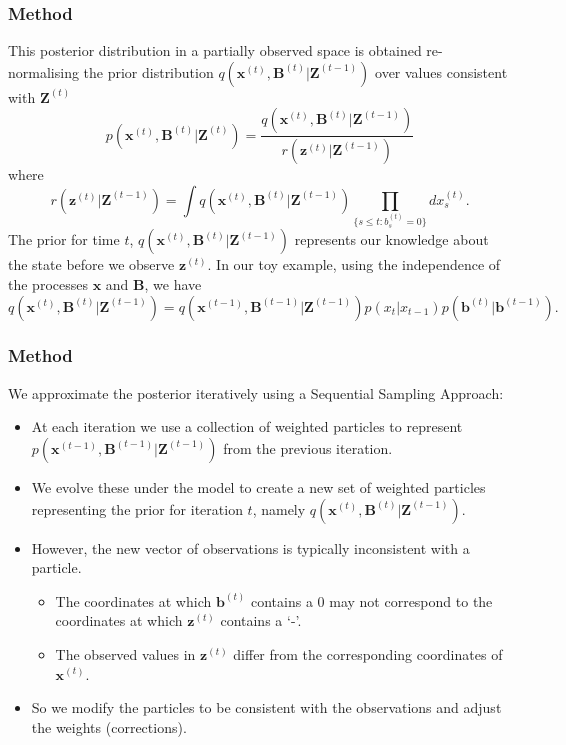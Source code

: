 \documentclass[9pt]{beamer}
\begin{document}
\begin{frame}
\frametitle{Method}
\begin{itemize}
\setlength\itemsep{2em}
This posterior distribution in a partially observed space is obtained re-normalising the prior distribution $q(\bm{x}^{(t)}, \bm{B}^{(t)} | \bm{Z}^{(t-1)}) $ over values consistent with $\bm{Z}^{(t)}$
\[
p(\bm{x}^{(t)}, \bm{B}^{(t)} | \bm{Z}^{(t)})  =   
\frac{ q(\bm{x}^{(t)}, \bm{B}^{(t)}|\bm{Z}^{(t-1)})} {r(\bm{z}^{(t)} | \bm{Z}^{(t-1)})}
\]
where 
\[
r(\bm{z}^{(t)} | \bm{Z}^{(t-1)}) = \int q(\bm{x}^{(t)}, \bm{B}^{(t)}|\bm{Z}^{(t-1)}) \prod_{\{s \leq t: b_s^{(t)} = 0\}}  dx_s^{(t)}.
\]
The prior for time $t$, $q(\bm{x}^{(t)},\bm{B}^{(t)} | \bm{Z}^{(t-1)})$ represents our knowledge about the state before we observe $\bm{z}^{(t)}$. In our toy example, using the independence of the processes $\bm{x}$ and $\bm{B}$, we have
\[
q(\bm{x}^{(t)},\bm{B}^{(t)} | \bm{Z}^{(t-1)}) = q(\bm{x}^{(t-1)},\bm{B}^{(t-1)} | \bm{Z}^{(t-1)}) p(x_t | x_{t-1}) p(\bm{b}^{(t)} | \bm{b}^{(t-1)}).
\]
\end{itemize}
\end{frame}

\begin{frame}
\frametitle{Method}
We approximate the posterior iteratively using a Sequential Sampling Approach:
\begin{itemize}
\setlength\itemsep{2em}
    \item At each iteration we use a collection of weighted particles to represent $p(\bm{x}^{(t-1)}, \bm{B}^{(t-1)} | \bm{Z}^{(t-1)})$ from the previous iteration.
    \item We evolve these under the model to create a new set of weighted particles representing the prior for iteration $t$, namely $q(\bm{x}^{(t)},\bm{B}^{(t)} | \bm{Z}^{(t-1)})$.
    \item However, the new vector of observations is typically inconsistent with a particle.
    \begin{itemize}
        \item The coordinates at which $\bm{b}^{(t)}$ contains a 0 may not correspond to the coordinates at which $\bm{z}^{(t)}$ contains a `-'.
        \item The observed values in $\bm{z}^{(t)}$ differ from the corresponding coordinates of $\bm{x}^{(t)}$.
\end{itemize}
\item So we modify the particles to be consistent with the observations and adjust the weights (corrections).
\end{itemize}
\end{frame}
\end{document}
